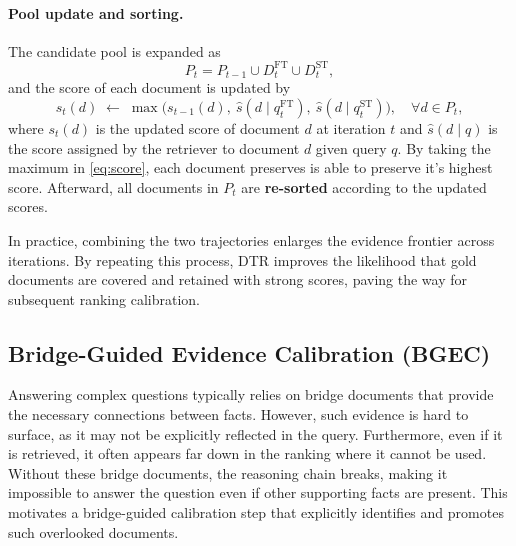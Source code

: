 \documentclass{article} %
\begin{document}
\paragraph{Pool update and sorting.}
The candidate pool is expanded as
\begin{equation}
P_t = P_{t-1} \cup D_t^{\text{FT}} \cup D_t^{\text{ST}},  
\label{eq:pool}
\end{equation}
and the score of each document is updated by
\begin{equation}
s_t(d) \;\leftarrow\; \max\!\Big( s_{t-1}(d),\ \hat{s}(d \mid q_t^{\text{FT}}),\ \hat{s}(d \mid q_t^{\text{ST}}) \Big), 
\quad \forall d \in P_t,
\label{eq:score}
\end{equation}
where $s_t(d)$ is the updated score of document $d$ at iteration $t$ and $\hat{s}(d \mid q)$ is the score assigned by the retriever to document $d$ given query $q$.  
By taking the maximum in \eqref{eq:score}, each document preserves is able to preserve it's highest score. 
Afterward, all documents in $P_t$ are \textbf{re-sorted} according to the updated scores.


In practice, combining the two trajectories enlarges the evidence frontier across iterations.  
By repeating this process, DTR improves the likelihood that gold documents are covered and retained with strong scores, paving the way for subsequent ranking calibration.


\subsection{Bridge-Guided Evidence Calibration (BGEC)}

Answering complex questions typically relies on bridge documents that provide the necessary connections between facts.  
However, such evidence is hard to surface, as it may not be explicitly reflected in the query. Furthermore, even if it is retrieved, it often appears far down in the ranking where it cannot be used.  
Without these bridge documents, the reasoning chain breaks, making it impossible to answer the question even if other supporting facts are present.  
This motivates a bridge-guided calibration step that explicitly identifies and promotes such overlooked documents.
\end{document}
